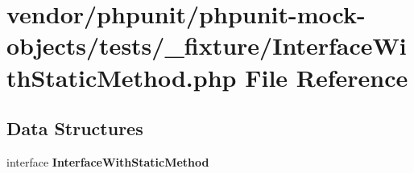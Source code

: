 \section{vendor/phpunit/phpunit-\/mock-\/objects/tests/\+\_\+fixture/\+Interface\+With\+Static\+Method.php File Reference}
\label{_interface_with_static_method_8php}
\subsection*{Data Structures}
\begin{DoxyCompactItemize}
\item 
interface {\bf Interface\+With\+Static\+Method}
\end{DoxyCompactItemize}
